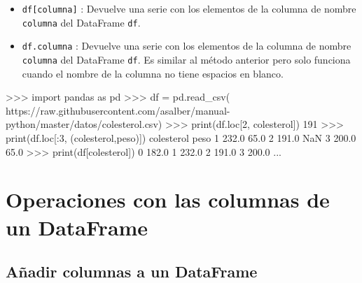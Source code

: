 \documentclass[
  spanish,
  a4paper,
]{scrreport}
\newenvironment{Shaded}{\begin{snugshade}}{\end{snugshade}}
\newcommand{\BuiltInTok}[1]{\textcolor[rgb]{0.00,0.23,0.31}{#1}}
\newcommand{\DecValTok}[1]{\textcolor[rgb]{0.68,0.00,0.00}{#1}}
\newcommand{\FloatTok}[1]{\textcolor[rgb]{0.68,0.00,0.00}{#1}}
\newcommand{\ImportTok}[1]{\textcolor[rgb]{0.00,0.46,0.62}{#1}}
\newcommand{\NormalTok}[1]{\textcolor[rgb]{0.00,0.23,0.31}{#1}}
\newcommand{\OperatorTok}[1]{\textcolor[rgb]{0.37,0.37,0.37}{#1}}
\newcommand{\StringTok}[1]{\textcolor[rgb]{0.13,0.47,0.30}{#1}}
\begin{document}
\begin{itemize}
\item
  \texttt{df{[}columna{]}} : Devuelve una serie con los elementos de la
  columna de nombre \texttt{columna} del DataFrame \texttt{df}.
\item
  \texttt{df.columna} : Devuelve una serie con los elementos de la
  columna de nombre \texttt{columna} del DataFrame \texttt{df}. Es
  similar al método anterior pero solo funciona cuando el nombre de la
  columna no tiene espacios en blanco.
\end{itemize}

\begin{Shaded}
\begin{Highlighting}[]
\OperatorTok{\textgreater{}\textgreater{}\textgreater{}} \ImportTok{import}\NormalTok{ pandas }\ImportTok{as}\NormalTok{ pd}
\OperatorTok{\textgreater{}\textgreater{}\textgreater{}}\NormalTok{ df }\OperatorTok{=}\NormalTok{ pd.read\_csv(}
\StringTok{\textquotesingle{}https://raw.githubusercontent.com/asalber/manual{-}python/master/datos/colesterol.csv\textquotesingle{}}\NormalTok{)}
\OperatorTok{\textgreater{}\textgreater{}\textgreater{}} \BuiltInTok{print}\NormalTok{(df.loc[}\DecValTok{2}\NormalTok{, }\StringTok{\textquotesingle{}colesterol\textquotesingle{}}\NormalTok{])}
\DecValTok{191}
\OperatorTok{\textgreater{}\textgreater{}\textgreater{}} \BuiltInTok{print}\NormalTok{(df.loc[:}\DecValTok{3}\NormalTok{, (}\StringTok{\textquotesingle{}colesterol\textquotesingle{}}\NormalTok{,}\StringTok{\textquotesingle{}peso\textquotesingle{}}\NormalTok{)])}
\NormalTok{     colesterol    peso}
\DecValTok{1}         \FloatTok{232.0}    \FloatTok{65.0}
\DecValTok{2}         \FloatTok{191.0}\NormalTok{     NaN}
\DecValTok{3}         \FloatTok{200.0}    \FloatTok{65.0}
\OperatorTok{\textgreater{}\textgreater{}\textgreater{}} \BuiltInTok{print}\NormalTok{(df[}\StringTok{\textquotesingle{}colesterol\textquotesingle{}}\NormalTok{])}
\DecValTok{0}     \FloatTok{182.0}
\DecValTok{1}     \FloatTok{232.0}
\DecValTok{2}     \FloatTok{191.0}
\DecValTok{3}     \FloatTok{200.0}
\NormalTok{...}
\end{Highlighting}
\end{Shaded}

\section{Operaciones con las columnas de un
DataFrame}\label{operaciones-con-las-columnas-de-un-dataframe}

\subsection{Añadir columnas a un
DataFrame}\label{auxf1adir-columnas-a-un-dataframe}
\end{document}
